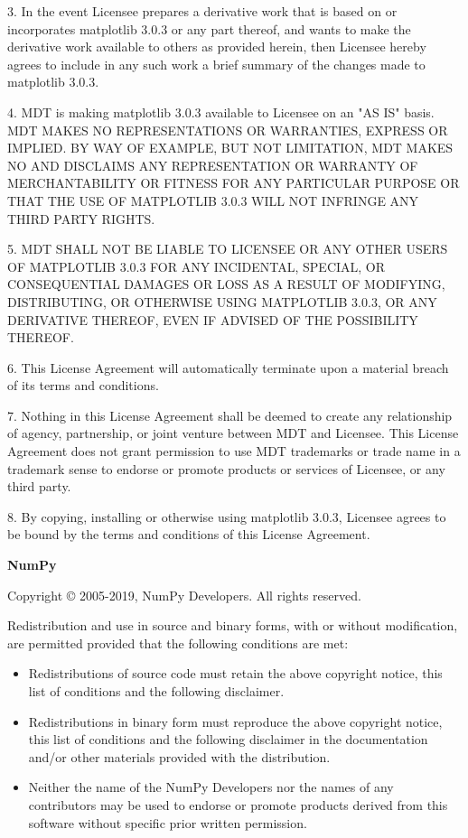 3. In the event Licensee prepares a derivative work that is based on or incorporates matplotlib 3.0.3 or any part thereof, and wants to make the derivative work available to others as provided herein, then Licensee hereby agrees to include in any such work a brief summary of the changes made to matplotlib 3.0.3.

4. MDT is making matplotlib 3.0.3 available to Licensee on an "AS IS" basis. MDT MAKES NO REPRESENTATIONS OR WARRANTIES, EXPRESS OR IMPLIED. BY WAY OF EXAMPLE, BUT NOT LIMITATION, MDT MAKES NO AND DISCLAIMS ANY REPRESENTATION OR WARRANTY OF MERCHANTABILITY OR FITNESS FOR ANY PARTICULAR PURPOSE OR THAT THE USE OF MATPLOTLIB 3.0.3 WILL NOT INFRINGE ANY THIRD PARTY RIGHTS.

5. MDT SHALL NOT BE LIABLE TO LICENSEE OR ANY OTHER USERS OF MATPLOTLIB 3.0.3 FOR ANY INCIDENTAL, SPECIAL, OR CONSEQUENTIAL DAMAGES OR LOSS AS A RESULT OF MODIFYING, DISTRIBUTING, OR OTHERWISE USING MATPLOTLIB 3.0.3, OR ANY DERIVATIVE THEREOF, EVEN IF ADVISED OF THE POSSIBILITY THEREOF.

6. This License Agreement will automatically terminate upon a material breach of its terms and conditions.

7. Nothing in this License Agreement shall be deemed to create any relationship of agency, partnership, or joint venture between MDT and Licensee. This License Agreement does not grant permission to use MDT trademarks or trade name in a trademark sense to endorse or promote products or services of Licensee, or any third party.

8. By copying, installing or otherwise using matplotlib 3.0.3, Licensee agrees to be bound by the terms and conditions of this License Agreement.
\newpage

\textbf{NumPy}

Copyright © 2005-2019, NumPy Developers.\newline
All rights reserved.

Redistribution and use in source and binary forms, with or without modification, are permitted provided that the following conditions are met:

\begin{itemize}
	\item Redistributions of source code must retain the above copyright notice, this list of conditions and the following disclaimer.
	\item Redistributions in binary form must reproduce the above copyright notice, this list of conditions and the following disclaimer in the documentation and/or other materials provided with the distribution.
	\item Neither the name of the NumPy Developers nor the names of any contributors may be used to endorse or promote products derived from this software without specific prior written permission.	
\end{itemize}

